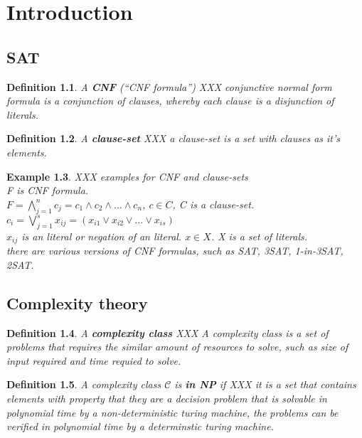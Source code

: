\documentclass[a4paper]{report}
\newtheorem{defi}{Definition}[section]
\newtheorem{examp}[defi]{Example}
\begin{document}
\chapter{Introduction}
\label{cha:Introduction}

\section{SAT}
\label{sec:BackgroundSAT}

\begin{defi}\label{def:CNF}
  A \textbf{CNF} (``CNF formula'')  XXX  conjunctive normal form formula is a conjunction of clauses, whereby each clause is a disjunction of literals.
\end{defi}

\begin{defi}\label{def:CLS}
  A \textbf{clause-set}  XXX a clause-set is a set with clauses as it's elements.
\end{defi}

\begin{examp}\label{exp:CLS}
  XXX examples for CNF and clause-sets\\
F is CNF formula.\\ 
$F = \bigwedge_{j=1}^{n} c_j = c_1 \wedge c_2 \wedge \dots \wedge c_n$,
$c \in C$,  C is a clause-set.\\
$c_i = \bigvee_{j=1}^{s} x_{ij} =  (x_{i1} \vee x_{i2} \vee \dots \vee x_{is})$\\
$x_{ij}$ is an literal or negation of an literal.
$x \in X$. X is a set of literals.\\

there are various versions of CNF formulas, such as SAT, 3SAT, 1-in-3SAT, 2SAT.
\end{examp}


\section{Complexity theory}
\label{sec:basicscomplexitytheory}

\begin{defi}\label{def:complexityclass}
  A \textbf{complexity class} XXX A complexity class is a set of problems that requires the similar amount of resources to solve, such as size of input required and time requied to solve.
\end{defi}

\begin{defi}\label{def:inNP}
  A complexity class $\mathcal{C}$ is \textbf{in NP} if XXX it is a set that contains elements with property that they are a decision problem that is solvable in polynomial time by a non-deterministic turing machine, the problems can be verified in polynomial time by a determinstic turing machine. 
\end{defi}
\end{document}
